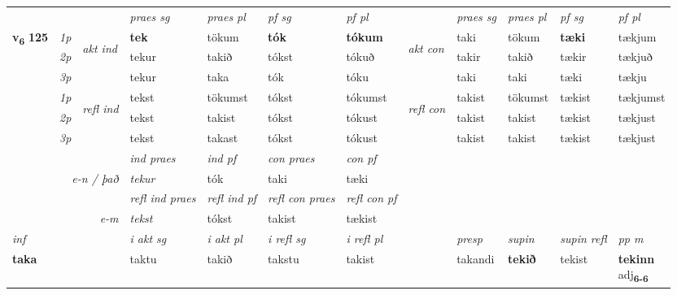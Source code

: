 \begin{longtable}[l]{X>{\footnotesize\itshape}llXXXXlXXXX}
 & &   & \textit{praes sg}  & \textit{praes pl}    & \textit{ pf sg} & \textit{pf pl} & & \textit{praes sg}  & \textit{praes pl}    & \textit{pf sg} & \textit{pf pl }  \\ \cmidrule{4-7} \cmidrule{9-12}
 \multirow{2}{*}{{{\textbf{v{\textsubscript{6}}} \Large{\textbf{125}}}}}  & 1p & \multirow{3}{*}{\begin{turn}{90}\textit{akt ind}\end{turn}} & \textbf{tek} & tökum & \textbf{tók} & \textbf{tókum} & \multirow{3}{*}{\begin{turn}{90}\textit{akt con}\end{turn}} &taki & tökum & \textbf{tæki} & tækjum\\*
 & 2p &  &  tekur  & takið & tókst & tókuð & & takir & takið & tækir & tækjuð \\*
 & 3p &  & tekur & taka & tók & tóku & & taki & taki& tæki & tækju \\*
\cmidrule{4-7} \cmidrule{9-12}
 & 1p & \multirow{3}{*}{\begin{turn}{90}\textit{refl ind}\end{turn}}  & tekst & tökumst & tókst & tókumst & \multirow{3}{*}{\begin{turn}{90}\textit{refl con}\end{turn}}  &takist & tökumst & tækist & tækjumst \\*
 & 2p &  & tekst & takist & tókst & tókust & &takist & takist & tækist & tækjust \\*
 & 3p  & & tekst & takast & tókst & tókust & & takist & takist& tækist & tækjust \\*
\cmidrule{4-7} \cmidrule{9-12}

   && &  \textit{ind praes} & \textit{ind pf} & \textit{con praes} & \textit{con pf} \\*
\multicolumn{3}{r}{\textit{e-n / það}} & tekur & tók & taki & tæki \\*

\cmidrule{4-7}
 & && \textit{refl ind praes} & \textit{refl ind pf} & \textit{refl con praes} & \textit{refl con pf} \\*
\multicolumn{3}{r}{\textit{e-m}}& tekst & tókst & takist & tækist \\*

\cmidrule{4-7}
   {\textit{inf}} & &  & \textit{i akt sg} & \textit{i akt pl} & \textit{i refl sg} & \textit{i refl pl} && \textit{presp} & \textit{supin} & \textit{supin refl} & \textit{pp m} \\*
  {\textbf{taka}} & && taktu  & takið & takstu & takist && takandi &  \textbf{tekið} & tekist & \specialcell{\textbf{tekinn} \\ adj\textbf{\textsubscript{6-6}}} \\*


\end{longtable}
